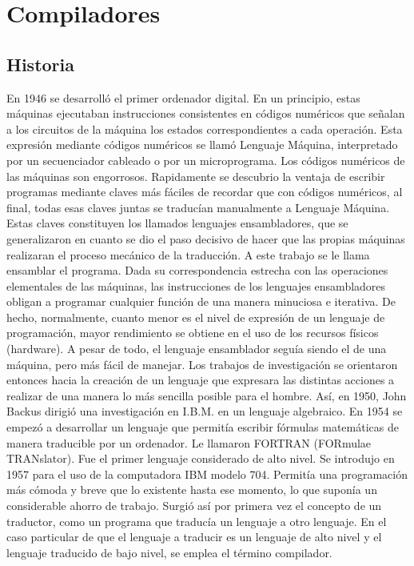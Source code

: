 
\chapter{Compiladores}

\section{Historia}

En 1946 se desarrolló el primer ordenador digital. En un principio, estas máquinas ejecutaban instrucciones consistentes en códigos numéricos que señalan a los circuitos de la máquina los estados correspondientes a cada operación. Esta expresión mediante códigos numéricos se llamó Lenguaje Máquina, interpretado por un secuenciador cableado o por un microprograma. Los códigos numéricos de las máquinas son engorrosos. Rapidamente se descubrio la ventaja de escribir programas mediante claves más fáciles de recordar que con códigos numéricos, al final, todas esas claves juntas se traducían manualmente a Lenguaje Máquina. Estas claves constituyen los llamados lenguajes ensambladores, que se generalizaron en cuanto se dio el paso decisivo de hacer que las propias máquinas realizaran el proceso mecánico de la traducción. A este trabajo se le llama ensamblar el programa. 
Dada su correspondencia estrecha con las operaciones elementales de las máquinas, las instrucciones de los lenguajes ensambladores obligan a programar cualquier función de una manera minuciosa e iterativa. De hecho, normalmente, cuanto menor es el nivel de expresión de un lenguaje de programación, mayor rendimiento se obtiene en el uso de los recursos físicos (hardware). A pesar de todo, el lenguaje ensamblador seguía siendo el de una máquina, pero más fácil de manejar. Los trabajos de investigación se orientaron entonces hacia la creación de un lenguaje que expresara las distintas acciones a realizar de una manera lo más sencilla posible para el hombre. Así, en 1950, John Backus dirigió una investigación en I.B.M. en un lenguaje algebraico. En 1954 se empezó a desarrollar un lenguaje que permitía escribir fórmulas matemáticas de manera traducible por un ordenador. Le llamaron FORTRAN (FORmulae TRANslator). Fue el primer lenguaje considerado de alto nivel. Se introdujo en 1957 para el uso de la computadora IBM modelo 704. Permitía una programación más cómoda y breve que lo existente hasta ese momento, lo que suponía un considerable ahorro de trabajo. Surgió así por primera vez el concepto de un traductor, como un programa que traducía un lenguaje a otro lenguaje. En el caso particular de que el lenguaje a traducir es un lenguaje de alto nivel y el lenguaje traducido de bajo nivel, se emplea el término compilador.
